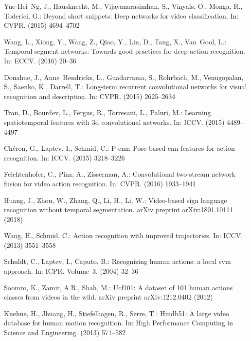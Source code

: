 \documentclass[runningheads,a4paper]{llncs}
\begin{document}
\begin{thebibliography}{10}
	Yue-Hei~Ng, J., Hausknecht, M., Vijayanarasimhan, S., Vinyals, O., Monga, R.,
	Toderici, G.:
	\newblock Beyond short snippets: Deep networks for video classification.
	\newblock In: CVPR. (2015)  4694--4702

	Wang, L., Xiong, Y., Wang, Z., Qiao, Y., Lin, D., Tang, X., Van~Gool, L.:
	\newblock Temporal segment networks: Towards good practices for deep action
	recognition.
	\newblock In: ECCV. (2016)  20--36

	Donahue, J., Anne~Hendricks, L., Guadarrama, S., Rohrbach, M., Venugopalan, S.,
	Saenko, K., Darrell, T.:
	\newblock Long-term recurrent convolutional networks for visual recognition and
	description.
	\newblock In: CVPR. (2015)  2625--2634

	Tran, D., Bourdev, L., Fergus, R., Torresani, L., Paluri, M.:
	\newblock Learning spatiotemporal features with 3d convolutional networks.
	\newblock In: ICCV. (2015)  4489--4497

	Ch{\'e}ron, G., Laptev, I., Schmid, C.:
	\newblock P-cnn: Pose-based cnn features for action recognition.
	\newblock In: ICCV. (2015)  3218--3226

	Feichtenhofer, C., Pinz, A., Zisserman, A.:
	\newblock Convolutional two-stream network fusion for video action recognition.
	\newblock In: CVPR. (2016)  1933--1941

	Huang, J., Zhou, W., Zhang, Q., Li, H., Li, W.:
	\newblock Video-based sign language recognition without temporal segmentation.
	\newblock arXiv preprint arXiv:1801.10111 (2018)

	Wang, H., Schmid, C.:
	\newblock Action recognition with improved trajectories.
	\newblock In: ICCV. (2013)  3551--3558

	Schuldt, C., Laptev, I., Caputo, B.:
	\newblock Recognizing human actions: a local svm approach.
	\newblock In: ICPR. Volume~3. (2004)  32--36

	Soomro, K., Zamir, A.R., Shah, M.:
	\newblock Ucf101: A dataset of 101 human actions classes from videos in the
	wild.
	\newblock arXiv preprint arXiv:1212.0402 (2012)

	Kuehne, H., Jhuang, H., Stiefelhagen, R., Serre, T.:
	\newblock Hmdb51: A large video database for human motion recognition.
	\newblock In: High Performance Computing in Science and Engineering.
	\newblock (2013)  571--582


\end{thebibliography}
\end{document}
